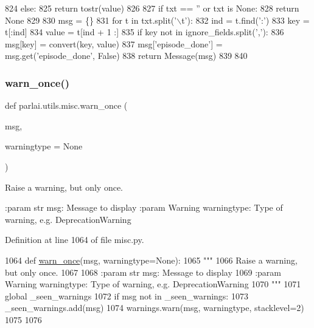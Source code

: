 \begin{DoxyCode}
824         \textcolor{keywordflow}{else}:
825             \textcolor{keywordflow}{return} tostr(value)
826 
827     \textcolor{keywordflow}{if} txt == \textcolor{stringliteral}{''} \textcolor{keywordflow}{or} txt \textcolor{keywordflow}{is} \textcolor{keywordtype}{None}:
828         \textcolor{keywordflow}{return} \textcolor{keywordtype}{None}
829 
830     msg = \{\}
831     \textcolor{keywordflow}{for} t \textcolor{keywordflow}{in} txt.split(\textcolor{stringliteral}{'\(\backslash\)t'}):
832         ind = t.find(\textcolor{stringliteral}{':'})
833         key = t[:ind]
834         value = t[ind + 1 :]
835         \textcolor{keywordflow}{if} key \textcolor{keywordflow}{not} \textcolor{keywordflow}{in} ignore\_fields.split(\textcolor{stringliteral}{','}):
836             msg[key] = convert(key, value)
837     msg[\textcolor{stringliteral}{'episode\_done'}] = msg.get(\textcolor{stringliteral}{'episode\_done'}, \textcolor{keyword}{False})
838     \textcolor{keywordflow}{return} Message(msg)
839 
840 
\end{DoxyCode}
\mbox{\label{namespaceparlai_1_1utils_1_1misc_acf146e70ea7f6867969a7c2b545d4b4b}} 
\subsubsection{\texorpdfstring{warn\+\_\+once()}{warn\_once()}}
{\footnotesize\ttfamily def parlai.\+utils.\+misc.\+warn\+\_\+once (\begin{DoxyParamCaption}\item[{}]{msg,  }\item[{}]{warningtype = {\ttfamily None} }\end{DoxyParamCaption})}

\begin{DoxyVerb}Raise a warning, but only once.

:param str msg: Message to display
:param Warning warningtype: Type of warning, e.g. DeprecationWarning
\end{DoxyVerb}
 

Definition at line 1064 of file misc.\+py.


\begin{DoxyCode}
1064 \textcolor{keyword}{def }\hyperlink{namespaceparlai_1_1utils_1_1misc_acf146e70ea7f6867969a7c2b545d4b4b}{warn\_once}(msg, warningtype=None):
1065     \textcolor{stringliteral}{"""}
1066 \textcolor{stringliteral}{    Raise a warning, but only once.}
1067 \textcolor{stringliteral}{}
1068 \textcolor{stringliteral}{    :param str msg: Message to display}
1069 \textcolor{stringliteral}{    :param Warning warningtype: Type of warning, e.g. DeprecationWarning}
1070 \textcolor{stringliteral}{    """}
1071     \textcolor{keyword}{global} \_seen\_warnings
1072     \textcolor{keywordflow}{if} msg \textcolor{keywordflow}{not} \textcolor{keywordflow}{in} \_seen\_warnings:
1073         \_seen\_warnings.add(msg)
1074         warnings.warn(msg, warningtype, stacklevel=2)
1075 
1076 
\end{DoxyCode}


